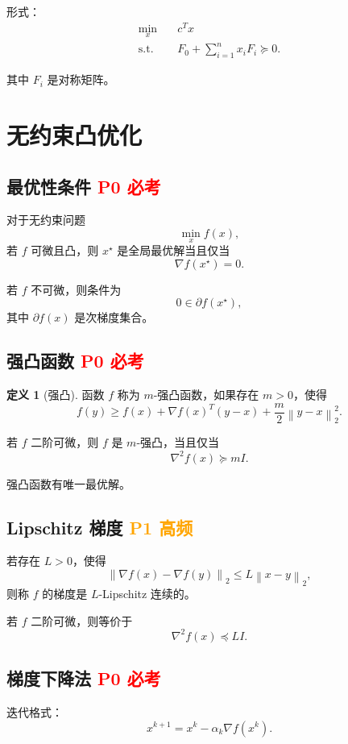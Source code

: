 \documentclass[11pt,a4paper]{ctexart}
\newcommand{\st}{\text{s.t.}}
\newcommand{\norm}[1]{\left\lVert #1 \right\rVert}
\newcommand{\Pzero}{\textcolor{red}{\textbf{P0 必考}}}
\newcommand{\Pone}{\textcolor{orange}{\textbf{P1 高频}}}
\theoremstyle{definition}
\newtheorem{definition}{定义}[section]
\theoremstyle{plain}
\theoremstyle{remark}
\begin{document}
形式：
\[
\begin{aligned}
    \min_x\quad & c^T x\\
    \st\quad & F_0+\sum_{i=1}^n x_i F_i \succeq 0.
\end{aligned}
\]

其中 $F_i$ 是对称矩阵。

\section{无约束凸优化}

\subsection{最优性条件 \Pzero}

对于无约束问题
\[
    \min_x f(x),
\]
若 $f$ 可微且凸，则 $x^\star$ 是全局最优解当且仅当
\[
    \nabla f(x^\star)=0.
\]

若 $f$ 不可微，则条件为
\[
    0\in \partial f(x^\star),
\]
其中 $\partial f(x)$ 是次梯度集合。

\subsection{强凸函数 \Pzero}

\begin{definition}[强凸]
函数 $f$ 称为 $m$-强凸函数，如果存在 $m>0$，使得
\[
    f(y)\ge f(x)+\nabla f(x)^T(y-x)+\frac{m}{2}\norm{y-x}_2^2.
\]
\end{definition}

若 $f$ 二阶可微，则 $f$ 是 $m$-强凸，当且仅当
\[
    \nabla^2 f(x)\succeq mI.
\]

强凸函数有唯一最优解。

\subsection{Lipschitz 梯度 \Pone}

若存在 $L>0$，使得
\[
    \norm{\nabla f(x)-\nabla f(y)}_2 \le L\norm{x-y}_2,
\]
则称 $f$ 的梯度是 $L$-Lipschitz 连续的。

若 $f$ 二阶可微，则等价于
\[
    \nabla^2 f(x)\preceq LI.
\]

\subsection{梯度下降法 \Pzero}

迭代格式：
\[
    x^{k+1}=x^k-\alpha_k \nabla f(x^k).
\]
\end{document}
